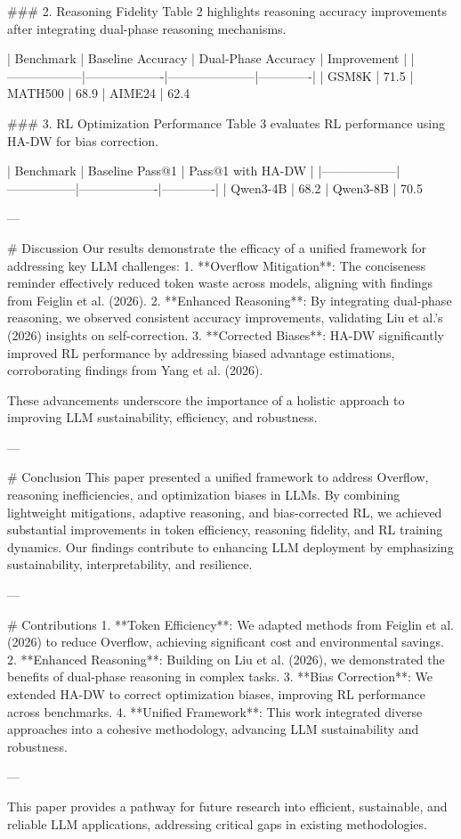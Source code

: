 ### 2. Reasoning Fidelity  
Table 2 highlights reasoning accuracy improvements after integrating dual-phase reasoning mechanisms.

| Benchmark       | Baseline Accuracy | Dual-Phase Accuracy | Improvement |
|------------------|-------------------|---------------------|-------------|
| GSM8K           | 71.5%
| MATH500         | 68.9%
| AIME24          | 62.4%

### 3. RL Optimization Performance  
Table 3 evaluates RL performance using HA-DW for bias correction.

| Benchmark       | Baseline Pass@1 | Pass@1 with HA-DW | %
|------------------|-----------------|-------------------|-------------|
| Qwen3-4B        | 68.2%
| Qwen3-8B        | 70.5%

---

# Discussion  
Our results demonstrate the efficacy of a unified framework for addressing key LLM challenges:  
1. **Overflow Mitigation**: The conciseness reminder effectively reduced token waste across models, aligning with findings from Feiglin et al. (2026).  
2. **Enhanced Reasoning**: By integrating dual-phase reasoning, we observed consistent accuracy improvements, validating Liu et al.'s (2026) insights on self-correction.  
3. **Corrected Biases**: HA-DW significantly improved RL performance by addressing biased advantage estimations, corroborating findings from Yang et al. (2026).  

These advancements underscore the importance of a holistic approach to improving LLM sustainability, efficiency, and robustness.

---

# Conclusion  
This paper presented a unified framework to address Overflow, reasoning inefficiencies, and optimization biases in LLMs. By combining lightweight mitigations, adaptive reasoning, and bias-corrected RL, we achieved substantial improvements in token efficiency, reasoning fidelity, and RL training dynamics. Our findings contribute to enhancing LLM deployment by emphasizing sustainability, interpretability, and resilience.

---

# Contributions  
1. **Token Efficiency**: We adapted methods from Feiglin et al. (2026) to reduce Overflow, achieving significant cost and environmental savings.  
2. **Enhanced Reasoning**: Building on Liu et al. (2026), we demonstrated the benefits of dual-phase reasoning in complex tasks.  
3. **Bias Correction**: We extended HA-DW to correct optimization biases, improving RL performance across benchmarks.  
4. **Unified Framework**: This work integrated diverse approaches into a cohesive methodology, advancing LLM sustainability and robustness.

--- 

This paper provides a pathway for future research into efficient, sustainable, and reliable LLM applications, addressing critical gaps in existing methodologies.